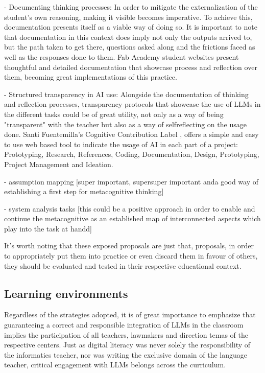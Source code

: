 \documentclass{article}
\begin{document}
- Documenting thinking processes: In order to mitigate the externalization of the student's own reasoning, making it visible becomes imperative. To achieve this, documentation presents itself as a viable way of doing so. It is important to note that documentation in this context does imply not only the outputs arrived to, but the path taken to get there, questions asked along and the frictions faced as well as the responses done to them. Fab Academy student websites \cite{castellanos2025fabacademy}\cite{mark2025fabacademy}\cite{surinach2022fabacademy} present thoughtful and detailed documentation that showcase process and reflection over them, becoming great implementations of this practice.

- Structured transparency in AI use: Alongside the documentation of thinking and reflection processes, transparency protocols that showcase the use of LLMs in the different tasks could be of great utility, not only as a way of being "transparent" with the teacher but also as a way of selfreflecting on the usage done. Santi Fuentemilla's Cognitive Contribution Label \cite{fuentemilla2024ccl}, offers a simple and easy to use web based tool to indicate the usage of AI in each part of a project: Prototyping, Research, References, Coding, Documentation, Design, Prototyping, Project Management and Ideation. 

- assumption mapping [super important, supersuper important anda good way of establishing a first step for metacognitive thinking]

- system analysis tasks [this could be a positive approach in order to enable and continue the metacognitive as an established map of interconnected aspects which play into the task at handd]

It's worth noting that these exposed proposals are just that, proposals, in order to appropriately put them into practice or even discard them in favour of others, they should be evaluated and tested in their respective educational context.

\subsection{Learning environments}

Regardless of the strategies adopted, it is of great importance to emphasize that guaranteeing a correct and responsible integration of LLMs in the classroom implies the participation of all teachers, lawmakers and direction temas of the respective centers. Just as digital literacy was never solely the responsibility of the informatics teacher, nor was writing the exclusive domain of the language teacher, critical engagement with LLMs belongs across the curriculum. 
\end{document}
